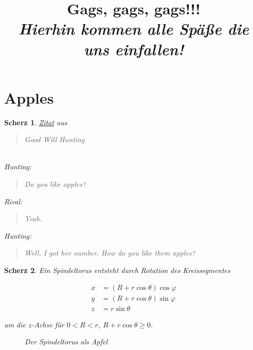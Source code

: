 \documentclass{article}
\title
{
  Gags, gags, gags!!! \\
  \vspace{4pt}
  \normalsize
  \textit{Hierhin kommen alle Späße die uns einfallen!}
}
\author{}
\date{}
\newtheorem{gag}{Scherz}[section]
\begin{document}
\maketitle

\section{Apples}

\begin{gag}

  \href{https://knowyourphrase.com/how-do-you-like-them-apples}{Zitat} aus \blockquote{Good Will Hunting}: \\

  Hunting:
  \blockquote{Do you like apples?}

  Rival:
  \blockquote{Yeah.}

  Hunting:
  \blockquote{Well, I got her number. How do you like them apples?}

\end{gag}

\begin{gag}

  Ein \textit{Spindeltorus} entsteht durch Rotation des Kreissegmentes

  \begin{align*}
    x & = (R + r \cos{\theta}) \cos{\varphi} \\
    y & = (R + r \cos{\theta}) \sin{\varphi} \\
    z & = r \sin{\theta}
  \end{align*}

  um die $z$-Achse für $0 < R < r$, $R + r \cos{\theta} \geq 0$.

  \begin{figure}[H]
    \centering
    \hspace{0mm}
    \caption{Der Spindeltorus als Apfel}
    \label{fig:apfel_apple}
  \end{figure}

\end{gag}
\end{document}
